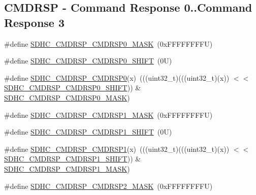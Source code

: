 \subsection*{C\+M\+D\+R\+SP -\/ Command Response 0..Command Response 3}
\begin{DoxyCompactItemize}
\item 
\#define \mbox{\hyperlink{group___s_d_h_c___register___masks_ga0e18ea51c0f8c567b8c7f0c8daed3a3f}{S\+D\+H\+C\+\_\+\+C\+M\+D\+R\+S\+P\+\_\+\+C\+M\+D\+R\+S\+P0\+\_\+\+M\+A\+SK}}~(0x\+F\+F\+F\+F\+F\+F\+F\+F\+U)
\item 
\#define \mbox{\hyperlink{group___s_d_h_c___register___masks_gaea81f8c10607500c0232c031cb1c736b}{S\+D\+H\+C\+\_\+\+C\+M\+D\+R\+S\+P\+\_\+\+C\+M\+D\+R\+S\+P0\+\_\+\+S\+H\+I\+FT}}~(0\+U)
\item 
\#define \mbox{\hyperlink{group___s_d_h_c___register___masks_ga9e228a5f41a153a74c6c5e567b4ec1ef}{S\+D\+H\+C\+\_\+\+C\+M\+D\+R\+S\+P\+\_\+\+C\+M\+D\+R\+S\+P0}}(x)~(((uint32\+\_\+t)(((uint32\+\_\+t)(x)) $<$$<$ \mbox{\hyperlink{group___s_d_h_c___register___masks_gaea81f8c10607500c0232c031cb1c736b}{S\+D\+H\+C\+\_\+\+C\+M\+D\+R\+S\+P\+\_\+\+C\+M\+D\+R\+S\+P0\+\_\+\+S\+H\+I\+FT}})) \& \mbox{\hyperlink{group___s_d_h_c___register___masks_ga0e18ea51c0f8c567b8c7f0c8daed3a3f}{S\+D\+H\+C\+\_\+\+C\+M\+D\+R\+S\+P\+\_\+\+C\+M\+D\+R\+S\+P0\+\_\+\+M\+A\+SK}})
\item 
\#define \mbox{\hyperlink{group___s_d_h_c___register___masks_gaf2029a539168eda397f19588b928af0f}{S\+D\+H\+C\+\_\+\+C\+M\+D\+R\+S\+P\+\_\+\+C\+M\+D\+R\+S\+P1\+\_\+\+M\+A\+SK}}~(0x\+F\+F\+F\+F\+F\+F\+F\+F\+U)
\item 
\#define \mbox{\hyperlink{group___s_d_h_c___register___masks_ga5954455de5b963fe88033ee57abc8682}{S\+D\+H\+C\+\_\+\+C\+M\+D\+R\+S\+P\+\_\+\+C\+M\+D\+R\+S\+P1\+\_\+\+S\+H\+I\+FT}}~(0\+U)
\item 
\#define \mbox{\hyperlink{group___s_d_h_c___register___masks_gaf0fd5fa34fba78caff6561aba2c97e03}{S\+D\+H\+C\+\_\+\+C\+M\+D\+R\+S\+P\+\_\+\+C\+M\+D\+R\+S\+P1}}(x)~(((uint32\+\_\+t)(((uint32\+\_\+t)(x)) $<$$<$ \mbox{\hyperlink{group___s_d_h_c___register___masks_ga5954455de5b963fe88033ee57abc8682}{S\+D\+H\+C\+\_\+\+C\+M\+D\+R\+S\+P\+\_\+\+C\+M\+D\+R\+S\+P1\+\_\+\+S\+H\+I\+FT}})) \& \mbox{\hyperlink{group___s_d_h_c___register___masks_gaf2029a539168eda397f19588b928af0f}{S\+D\+H\+C\+\_\+\+C\+M\+D\+R\+S\+P\+\_\+\+C\+M\+D\+R\+S\+P1\+\_\+\+M\+A\+SK}})
\item 
\#define \mbox{\hyperlink{group___s_d_h_c___register___masks_ga60782d85358658786d1a76fe99379622}{S\+D\+H\+C\+\_\+\+C\+M\+D\+R\+S\+P\+\_\+\+C\+M\+D\+R\+S\+P2\+\_\+\+M\+A\+SK}}~(0x\+F\+F\+F\+F\+F\+F\+F\+F\+U)

\end{DoxyCompactItemize}
